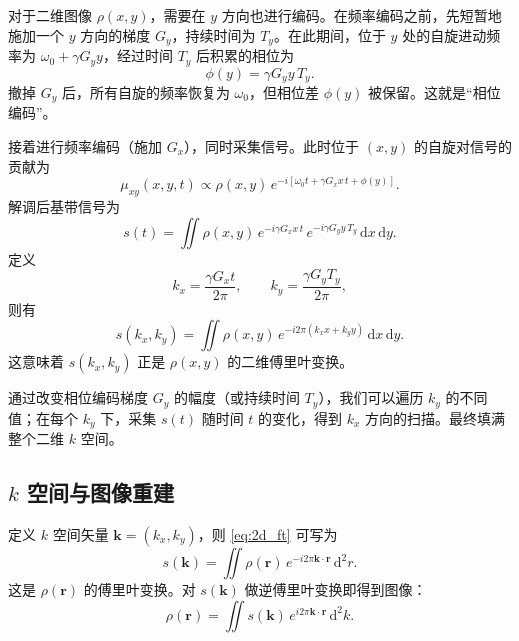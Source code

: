 \documentclass[12pt,a4paper]{article}
\begin{document}
	对于二维图像 $\rho(x,y)$，需要在 $y$ 方向也进行编码。在频率编码之前，先短暂地施加一个 $y$ 方向的梯度 $G_y$，持续时间为 $T_y$。在此期间，位于 $y$ 处的自旋进动频率为 $\omega_0 + \gamma G_y y$，经过时间 $T_y$ 后积累的相位为
	\begin{equation}
		\phi(y) = \gamma G_y y \, T_y.
	\end{equation}
	撤掉 $G_y$ 后，所有自旋的频率恢复为 $\omega_0$，但相位差 $\phi(y)$ 被保留。这就是“相位编码”。
	
	接着进行频率编码（施加 $G_x$），同时采集信号。此时位于 $(x,y)$ 的自旋对信号的贡献为
	\begin{equation}
		\mu_{xy}(x,y,t) \propto \rho(x,y) \, e^{-i[\omega_0 t + \gamma G_x x \, t + \phi(y)]}.
	\end{equation}
	解调后基带信号为
	\begin{equation}
		s(t) = \iint \rho(x,y) \, e^{-i \gamma G_x x \, t} \, e^{-i \gamma G_y y \, T_y} \, \mathrm{d}x\,\mathrm{d}y.
	\end{equation}
	定义
	\begin{equation}
		k_x = \frac{\gamma G_x t}{2\pi}, \qquad k_y = \frac{\gamma G_y T_y}{2\pi},
	\end{equation}
	则有
	\begin{equation}
		s(k_x, k_y) = \iint \rho(x,y) \, e^{-i 2\pi (k_x x + k_y y)} \, \mathrm{d}x\,\mathrm{d}y.
		\label{eq:2d_ft}
	\end{equation}
	这意味着 $s(k_x,k_y)$ 正是 $\rho(x,y)$ 的二维傅里叶变换。
	
	通过改变相位编码梯度 $G_y$ 的幅度（或持续时间 $T_y$），我们可以遍历 $k_y$ 的不同值；在每个 $k_y$ 下，采集 $s(t)$ 随时间 $t$ 的变化，得到 $k_x$ 方向的扫描。最终填满整个二维 $k$ 空间。
	
	\subsection{$k$ 空间与图像重建}
	
	定义 $k$ 空间矢量 $\mathbf{k} = (k_x, k_y)$，则 \eqref{eq:2d_ft} 可写为
	\begin{equation}
		s(\mathbf{k}) = \iint \rho(\mathbf{r}) \, e^{-i 2\pi \mathbf{k}\cdot\mathbf{r}} \, \mathrm{d}^2r.
	\end{equation}
	这是 $\rho(\mathbf{r})$ 的傅里叶变换。对 $s(\mathbf{k})$ 做逆傅里叶变换即得到图像：
	\begin{equation}
		\rho(\mathbf{r}) = \iint s(\mathbf{k}) \, e^{i 2\pi \mathbf{k}\cdot\mathbf{r}} \, \mathrm{d}^2k.
	\end{equation}
	
\end{document}

